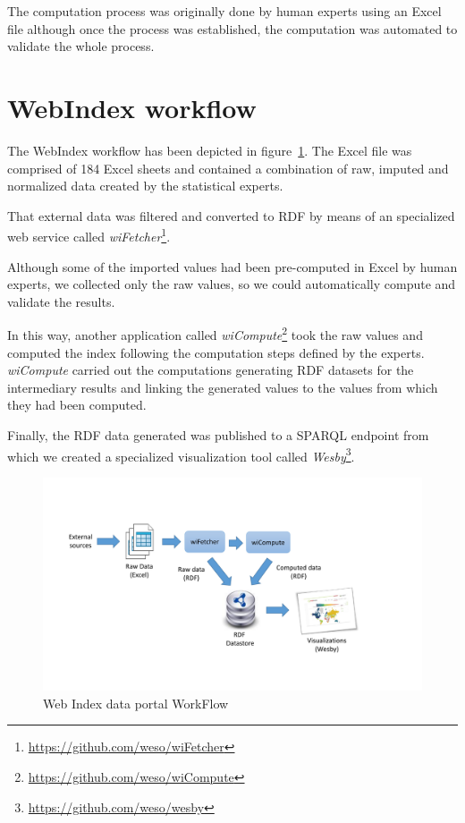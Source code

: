 \documentclass{llncs}
\begin{document}
The computation process was originally done by human experts using an Excel file although
once the process was established, the computation was automated to validate the whole process. 

\section{WebIndex workflow}

The WebIndex workflow has been depicted in figure~\ref{Fig:WebIndexWorkFlow}. 
The Excel file was comprised of 184 Excel sheets and contained a combination
 of raw, imputed and normalized data created by the statistical experts. 

That external data was filtered and converted to RDF by means of an specialized web service called \emph{wiFetcher}\footnote{\url{https://github.com/weso/wiFetcher}}. 

Although some of the imported values had been
 pre-computed in Excel by human experts, we collected only the raw values, so we could automatically compute and validate the results. 

In this way, another application called \emph{wiCompute}\footnote{\url{https://github.com/weso/wiCompute}} 
 took the raw values and computed the index following the
 computation steps defined by the experts. 
\emph{wiCompute} carried out the computations
 generating RDF datasets for the intermediary results and linking the generated values
 to the values from which they had been computed.
 
Finally, the RDF data generated was published to a SPARQL endpoint from which we created
a specialized visualization tool called \emph{Wesby}\footnote{\url{https://github.com/weso/wesby}}.

\begin{figure}[h]
\begin{center}
  \includegraphics[width=\textwidth]{WebIndexWorkFlow}
\end{center}
\caption{Web Index data portal WorkFlow}
\label{Fig:WebIndexWorkFlow}
\end{figure}
\end{document}
